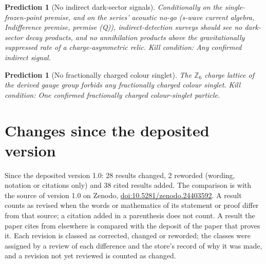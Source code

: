 \documentclass[11pt]{article}
\newtheorem{prediction}[theorem]{Prediction}
\theoremstyle{definition}
\theoremstyle{plain}
\begin{document}
\begin{prediction}[No indirect dark-sector signals]\label{c:pred.no-indirect-dark-signals}
Conditionally on the single-frozen-point premise, and on the series' acoustic no-go (s-wave current algebra, Indifference premise, premise (Q)), indirect-detection surveys should see no dark-sector decay products, and no annihilation products above the gravitationally suppressed rate of a charge-asymmetric relic.
\emph{Kill condition:} Any confirmed indirect signal.
\end{prediction}

\begin{prediction}[No fractionally charged colour singlet]\label{c:pred.z6-charge-lattice}
The $\mathbb{Z}_{6}$ charge lattice of the derived gauge group forbids any fractionally charged colour singlet.
\emph{Kill condition:} One confirmed fractionally charged colour-singlet particle.
\end{prediction}

\section*{Changes since the deposited version}
Since the deposited version 1.0: 28 results changed, 2 reworded (wording, notation or citations only) and 38 cited results added. The comparison is with the source of version 1.0 on Zenodo, \href{https://doi.org/10.5281/zenodo.24403592}{doi:10.5281/zenodo.24403592}. A result counts as revised when the words or mathematics of its statement or proof differ from that source; a citation added in a parenthesis does not count. A result the paper cites from elsewhere is compared with the deposit of the paper that proves it. Each revision is classed as corrected, changed or reworded; the classes were assigned by a review of each difference and the store's record of why it was made, and a revision not yet reviewed is counted as changed.
\end{document}
